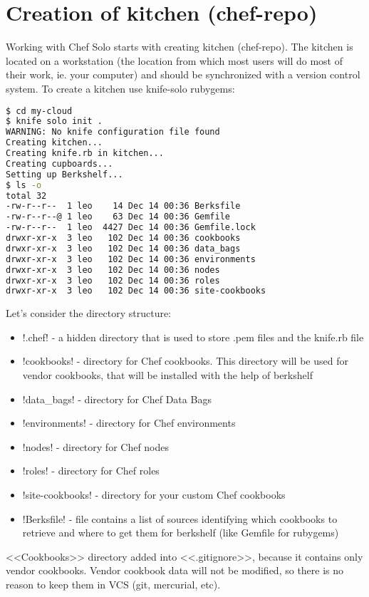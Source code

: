 \section{Creation of kitchen (chef-repo)}
\label{sec:solo-kitchen}

Working with Chef Solo starts with creating kitchen (chef-repo). The kitchen is located on a workstation (the location from which most users will do most of their work, ie. your computer) and should be synchronized with a version control system. To create a kitchen use knife-solo rubygems:

\begin{lstlisting}[language=Bash,label=lst:my-cloud-kitchen1,title=my-cloud]
$ cd my-cloud
$ knife solo init .
WARNING: No knife configuration file found
Creating kitchen...
Creating knife.rb in kitchen...
Creating cupboards...
Setting up Berkshelf...
$ ls -o
total 32
-rw-r--r--  1 leo    14 Dec 14 00:36 Berksfile
-rw-r--r--@ 1 leo    63 Dec 14 00:36 Gemfile
-rw-r--r--  1 leo  4427 Dec 14 00:36 Gemfile.lock
drwxr-xr-x  3 leo   102 Dec 14 00:36 cookbooks
drwxr-xr-x  3 leo   102 Dec 14 00:36 data_bags
drwxr-xr-x  3 leo   102 Dec 14 00:36 environments
drwxr-xr-x  3 leo   102 Dec 14 00:36 nodes
drwxr-xr-x  3 leo   102 Dec 14 00:36 roles
drwxr-xr-x  3 leo   102 Dec 14 00:36 site-cookbooks
\end{lstlisting}

Let's consider the directory structure:

\begin{itemize}
  \item \inline!.chef! - a hidden directory that is used to store .pem files and the knife.rb file
  \item \inline!cookbooks! - directory for Chef cookbooks. This directory will be used for vendor cookbooks, that will be installed with the help of berkshelf
  \item \inline!data_bags! - directory for Chef Data Bags
  \item \inline!environments! - directory for Chef environments
  \item \inline!nodes! - directory for Chef nodes
  \item \inline!roles! - directory for Chef roles
  \item \inline!site-cookbooks! - directory for your custom Chef cookbooks
  \item \inline!Berksfile! - file contains a list of sources identifying which cookbooks to retrieve and where to get them for berkshelf (like Gemfile for rubygems)
\end{itemize}

<<Cookbooks>> directory added into <<.gitignore>>, because it contains only vendor cookbooks. Vendor cookbook data will not be modified, so there is no reason to keep them in VCS (git, mercurial, etc).
